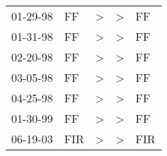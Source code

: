 \begin{supertabular}{lllll}
 01-29-98 &   FF &  \textgreater &  \textgreater &   FF \\
 01-31-98 &   FF &  \textgreater &  \textgreater &   FF \\
 02-20-98 &   FF &  \textgreater &  \textgreater &   FF \\
 03-05-98 &   FF &  \textgreater &  \textgreater &   FF \\
 04-25-98 &   FF &  \textgreater &  \textgreater &   FF \\
 01-30-99 &   FF &  \textgreater &  \textgreater &   FF \\
 06-19-03 &  FIR &  \textgreater &  \textgreater &  FIR \\
\end{supertabular}
